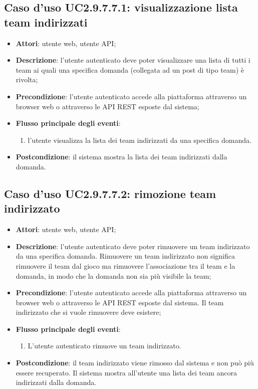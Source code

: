 \subsection{Caso d'uso UC2.9.7.7.1: visualizzazione lista team indirizzati}
\begin{itemize}
\item \textbf{Attori}: utente web, utente API;
\item \textbf{Descrizione}: l'utente autenticato deve poter visualizzare una lista di tutti i team ai quali una specifica domanda (collegata ad un post di tipo team) è rivolta; 
      \item \textbf{Precondizione}: l'utente autenticato accede alla piattaforma attraverso un browser web o attraverso le API REST esposte dal sistema;

        \item \textbf{Flusso principale degli eventi}:
          \begin{enumerate}
          \item l'utente visualizza la lista dei team indirizzati da una specifica domanda.

      \end{enumerate}
    \item \textbf{Postcondizione}: il sistema mostra la lista dei team indirizzati dalla domanda.
  \end{itemize}
\hypertarget{UC2.9.7.7.2}{}
\subsection{Caso d'uso UC2.9.7.7.2: rimozione team indirizzato}
\begin{itemize}
\item \textbf{Attori}: utente web, utente API;
\item \textbf{Descrizione}: l'utente autenticato deve poter rimuovere un team indirizzato da una specifica domanda. Rimuovere un team indirizzato non significa rimuovere il team dal gioco ma rimuovere l'associazione tra il team e la domanda, in modo che la domanda non sia più visibile la team; 
      \item \textbf{Precondizione}: l'utente autenticato accede alla piattaforma attraverso un browser web o attraverso le API REST esposte dal sistema. Il team indirizzato che si vuole rimuovere deve esistere;

        \item \textbf{Flusso principale degli eventi}:
          \begin{enumerate}
          \item L'utente autenticato rimuove un team indirizzato.

      \end{enumerate}
    \item \textbf{Postcondizione}: il team indirizzato viene rimosso dal sistema e non può più essere recuperato. Il sistema mostra all'utente una lista dei team ancora indirizzati dalla domanda.
  \end{itemize}
\hypertarget{UC2.9.7.8}{}
